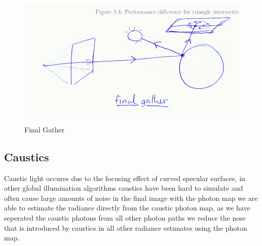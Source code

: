 \begin{figure}
\centering
\includegraphics[width=\textwidth]{./images/final_gather.png}
\label{fig:final_gather}
\caption{Final Gather}
\end{figure}

\subsection{Caustics}
Caustic light occures due to the focusing effect of curved specular surfaces, in other global illumination algorithms
caustics have been hard to simulate  and often cause large amounts of noise in the final image 
with the photon map we are able to estimate the radiance directly from the caustic photon map, as we have seperated the
caustic photons from all other photon paths we reduce the nose that is introduced by caustics in all other radiance
estimates using the photon map.

